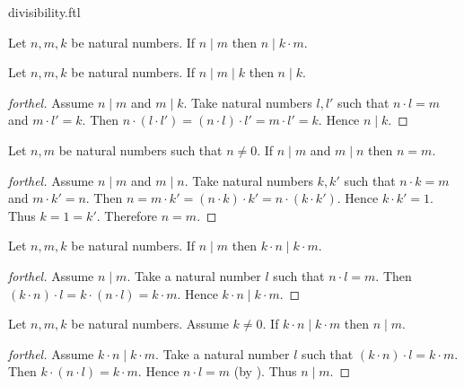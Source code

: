\documentclass{naproche-library}
\begin{document}
\begin{smodule}[title=Divisibility]{divisibility.ftl}
\begin{corollary}[forthel,id=ARITHMETIC_07_1588185794609152]
  Let $n, m, k$ be natural numbers.
  If $n \mid m$ then $n \mid k \cdot m$.
\end{corollary}

\begin{proposition}[forthel,id=ARITHMETIC_07_7863858316181504]
  Let $n, m, k$ be natural numbers.
  If $n \mid m \mid k$ then $n \mid k$.
\end{proposition}
\begin{proof}[forthel]
  Assume $n \mid m$ and $m \mid k$.
  Take natural numbers $l,l'$ such that $n \cdot l = m$ and $m \cdot l' = k$.
  Then $n \cdot (l \cdot l')
    = (n \cdot l) \cdot l'
    = m \cdot l'
    = k$.
  Hence $n \mid k$.
\end{proof}

\begin{proposition}[forthel,id=ARITHMETIC_07_4933275640397824]
  Let $n, m$ be natural numbers such that $n \neq 0$.
  If $n \mid m$ and $m \mid n$ then $n = m$.
\end{proposition}
\begin{proof}[forthel]
  Assume $n \mid m$ and $m \mid n$.
  Take natural numbers $k,k'$ such that $n \cdot k = m$ and $m \cdot k' = n$.
  Then $n
    = m \cdot k'
    = (n \cdot k) \cdot k'
    = n \cdot (k \cdot k')$.
  Hence $k \cdot k' = 1$.
  Thus $k = 1 = k'$.
  Therefore $n = m$.
\end{proof}

\begin{proposition}[forthel,id=ARITHMETIC_07_1283495225720832]
  Let $n, m, k$ be natural numbers.
  If $n \mid m$ then $k \cdot n \mid k \cdot m$.
\end{proposition}
\begin{proof}[forthel]
  Assume $n \mid m$.
  Take a natural number $l$ such that $n \cdot l = m$.
  Then $(k \cdot n) \cdot l
    = k \cdot (n \cdot l)
    = k \cdot m$.
  Hence $k \cdot n \mid k \cdot m$.
\end{proof}

\begin{proposition}[forthel,id=ARITHMETIC_07_6469492028735488]
  Let $n, m, k$ be natural numbers.
  Assume $k \neq 0$.
  If $k \cdot n \mid k \cdot m$ then $n \mid m$.
\end{proposition}
\begin{proof}[forthel]
  Assume $k \cdot n \mid k \cdot m$.
  Take a natural number $l$ such that $(k \cdot n) \cdot l = k \cdot m$.
  Then $k \cdot (n \cdot l) = k \cdot m$.
  Hence $n \cdot l = m$ (by ).
  Thus $n \mid m$.
\end{proof}


\end{smodule}
\end{document}
